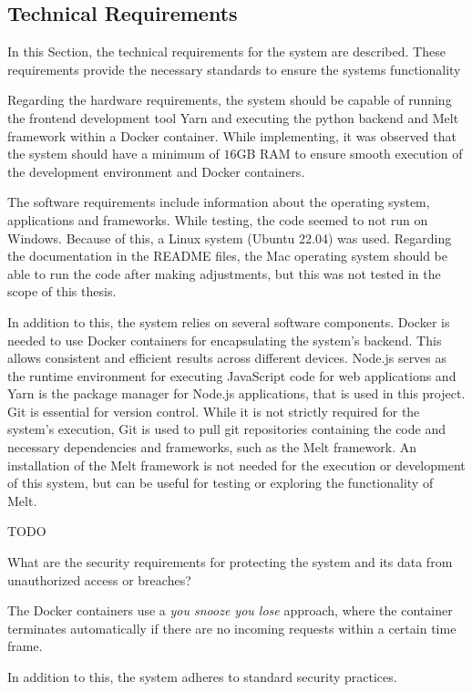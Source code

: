 \documentclass[../MasterThesis.tex]{subfiles}
\begin{document}
\subsection{Technical Requirements} \label{subsection:technicalrequirements}


In this Section, the technical requirements for the system are described. These requirements provide the necessary standards to ensure the systems functionality

Regarding the hardware requirements, the system should be capable of running the frontend development tool Yarn and executing the python backend and Melt framework within a Docker container.
While implementing, it was observed that the system should have a minimum of $16$GB RAM to ensure smooth execution of the development environment and Docker containers.



The software requirements include information about the operating system, applications and frameworks.
While testing, the code seemed to not run on Windows. Because of this, a Linux system (Ubuntu 22.04) was used. Regarding the documentation in the README files, the Mac operating system should be able to run the code after making adjustments, but this was not tested in the scope of this thesis.


In addition to this, the system relies on several software components.
Docker is needed to use Docker containers for encapsulating the system's backend. This allows consistent and efficient results across different devices.
Node.js serves as the runtime environment for executing JavaScript code for web applications and Yarn is the package manager for Node.js applications, that is used in this project.
Git is essential for version control. While it is not strictly required for the system's execution, Git is used to pull git repositories containing the code and necessary dependencies and frameworks, such as the Melt framework. 
An installation of the Melt framework is not needed for the execution or development of this system, but can be useful for testing or exploring the functionality of Melt.


TODO

What are the security requirements for protecting the system and its data from unauthorized access or breaches?

The Docker containers use a \textit{you snooze you lose} approach, where the container terminates automatically if there are no incoming requests within a certain time frame. 

In addition to this, the system adheres to standard security practices.


	
	
	
	
\end{document}
